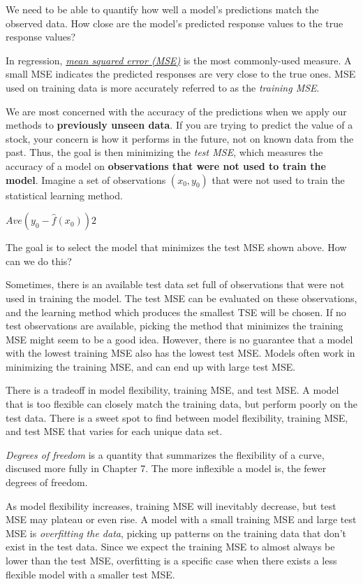 \documentclass[]{book}
\begin{document}
We need to be able to quantify how well a model's predictions match the observed data. How close are the model's predicted response values to the true response values?

In regression, \href{https://en.wikipedia.org/wiki/Mean_squared_error}{\emph{mean squared error (MSE)}} is the most commonly-used measure. A small MSE indicates the predicted responses are very close to the true ones. MSE used on training data is more accurately referred to as the \emph{training MSE}.

We are most concerned with the accuracy of the predictions when we apply our methods to \textbf{previously unseen data}. If you are trying to predict the value of a stock, your concern is how it performs in the future, not on known data from the past. Thus, the goal is then minimizing the \emph{test MSE}, which measures the accuracy of a model on \textbf{observations that were not used to train the model}. Imagine a set of observations \((x_0, y_0)\) that were not used to train the statistical learning method.

\(Ave(y_0 - \hat{f}(x_0))2\)

The goal is to select the model that minimizes the test MSE shown above. How can we do this?

Sometimes, there is an available test data set full of observations that were not used in training the model. The test MSE can be evaluated on these observations, and the learning method which produces the smallest TSE will be chosen. If no test observations are available, picking the method that minimizes the training MSE might seem to be a good idea. However, there is no guarantee that a model with the lowest training MSE also has the lowest test MSE. Models often work in minimizing the training MSE, and can end up with large test MSE.

There is a tradeoff in model flexibility, training MSE, and test MSE. A model that is too flexible can closely match the training data, but perform poorly on the test data. There is a sweet spot to find between model flexibility, training MSE, and test MSE that varies for each unique data set.

\emph{Degrees of freedom} is a quantity that summarizes the flexibility of a curve, discused more fully in Chapter 7. The more inflexible a model is, the fewer degrees of freedom.

As model flexibility increases, training MSE will inevitably decrease, but test MSE may plateau or even rise. A model with a small training MSE and large test MSE is \emph{overfitting the data}, picking up patterns on the training data that don't exist in the test data. Since we expect the training MSE to almost always be lower than the test MSE, overfitting is a specific case when there exists a less flexible model with a smaller test MSE.
\end{document}
